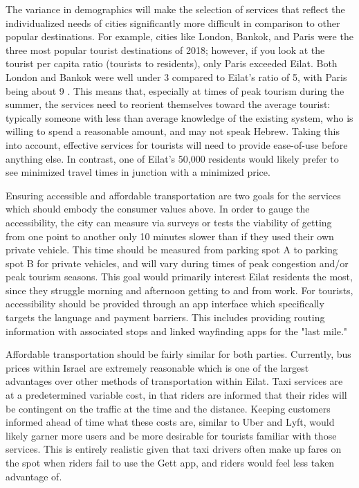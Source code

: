 \documentclass[12pt]{article}                               %
\begin{document}
The variance in demographics will make the selection of services that reflect the individualized needs of cities significantly more difficult in comparison to other popular destinations. For example, cities like London, Bankok, and Paris were the three most popular tourist destinations of 2018; however, if you look at the tourist per capita ratio (tourists to residents), only Paris exceeded Eilat. Both London and Bankok were well under 3 compared to Eilat's ratio of 5, with Paris being about 9 \cite{Murray2018MostInsider}. This means that, especially at times of peak tourism during the summer, the services need to reorient themselves toward the average tourist: typically someone with less than average knowledge of the existing system, who is willing to spend a reasonable amount, and may not speak Hebrew. Taking this into account, effective services for tourists will need to provide ease-of-use before anything else. In contrast, one of Eilat's 50,000 residents would likely prefer to see minimized travel times in junction with a minimized price. 

Ensuring accessible and affordable transportation are two goals for the services which should embody the consumer values above. In order to gauge the accessibility, the city can measure via surveys or tests the viability of getting from one point to another only 10 minutes slower than if they used their own private vehicle. This time should be measured from parking spot A to parking spot B for private vehicles, and will vary during times of peak congestion and/or peak tourism seasons. This goal would primarily interest Eilat residents the most, since they struggle morning and afternoon getting to and from work. For tourists, accessibility should be provided through an app interface which specifically targets the language and payment barriers. This includes providing routing information with associated stops and linked wayfinding apps for the "last mile."

Affordable transportation should be fairly similar for both parties. Currently, bus prices within Israel are extremely reasonable which is one of the largest advantages over other methods of transportation within Eilat. Taxi services are at a predetermined variable cost, in that riders are informed that their rides will be contingent on the traffic at the time and the distance. Keeping customers informed ahead of time what these costs are, similar to Uber and Lyft, would likely garner more users and be more desirable for tourists familiar with those services. This is entirely realistic given that taxi drivers often make up fares on the spot when riders fail to use the Gett app, and riders would feel less taken advantage of.
\end{document}
